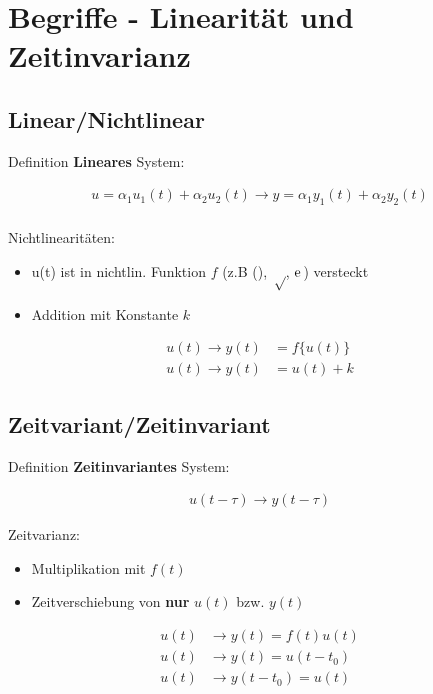 \documentclass[10pt,a4paper]{article}
\begin{document}
\twocolumn
\pagestyle{fancy}
\section{Begriffe - Linearität und Zeitinvarianz}
  \subsection{Linear/Nichtlinear}
  Definition \textbf{Lineares} System:
  \begin{mdframed}[style=exercise]
    \begin{align}
        u = \alpha_1 u_1(t)+ \alpha_2 u_2(t)\rightarrow y = \alpha_1 y_1(t)+ \alpha_2 y_2(t) \\  
    \end{align}
  \end{mdframed}
  Nichtlinearitäten: 
  \begin{itemize}
    \item u(t) ist in nichtlin. Funktion $f$ (z.B \sin(), $\sqrt$, $\e$) versteckt
    \item Addition mit Konstante $k$
  \end{itemize}
  \begin{mdframed}[style=exercise]
    \begin{align}
        u(t)\rightarrow y(t) &= f\{u(t)\} \\
        u(t)\rightarrow y(t) &= u(t) + k
    \end{align}
  \end{mdframed}

  \subsection{Zeitvariant/Zeitinvariant}
  Definition \textbf{Zeitinvariantes} System:
  \begin{mdframed}[style=exercise]
    \begin{align}
        u(t-\tau) \rightarrow y(t-\tau)
    \end{align}
  \end{mdframed}
  Zeitvarianz: 
  \begin{itemize}
    \item Multiplikation mit $f(t)$
    \item Zeitverschiebung von \textbf{nur} $u(t)$ bzw. $y(t)$
  \end{itemize}
  \begin{mdframed}[style=exercise]
    \begin{align}
        u(t) &\rightarrow y(t) = f(t)u(t)\\
        u(t) &\rightarrow y(t) = u(t-t_0)\\
        u(t) &\rightarrow y(t-t_0) = u(t)
    \end{align}
  \end{mdframed}
\end{document}
